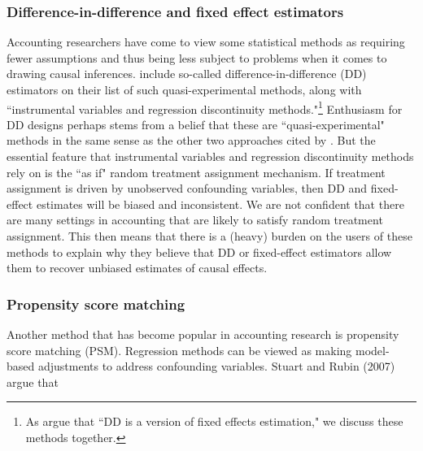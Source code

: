 \documentclass[11pt,reqno,titlepage]{amsart}
\begin{document}
\begin{doublespace}
\subsubsection{Difference-in-difference and fixed effect estimators}
Accounting researchers have come to view some statistical methods as requiring fewer assumptions and thus being less subject to problems when it comes to drawing causal inferences. 
\citet[p.\,12]{Angrist:2010jv} include so-called difference-in-difference (DD) estimators on their list of such quasi-experimental methods, along with ``instrumental variables and regression discontinuity methods."\footnote{As \citet[p.\,228]{Angrist:2008vk} argue that ``DD is a version of fixed effects estimation," we discuss these methods together.}
Enthusiasm for DD designs perhaps stems from a belief that these are ``quasi-experimental" methods in the same sense as the other two approaches cited by \citet[p.\,12]{Angrist:2010jv}.
But the essential feature that instrumental variables and regression discontinuity methods rely on is the ``as if" random treatment assignment mechanism.
If treatment assignment is driven by unobserved confounding variables, then DD and fixed-effect estimates will be biased and inconsistent. 
We are not confident that there are many settings in accounting that are likely to satisfy random treatment assignment.
This then means that there is a (heavy) burden on the users of these methods to explain why they believe that DD or fixed-effect estimators allow them to recover unbiased estimates of causal effects.


\subsubsection{Propensity score matching}
Another method that has become popular in accounting research is propensity score matching (PSM).
Regression methods can be viewed as making model-based adjustments to address confounding variables.  
Stuart and Rubin (2007) argue that 


\end{doublespace}
\end{document}

